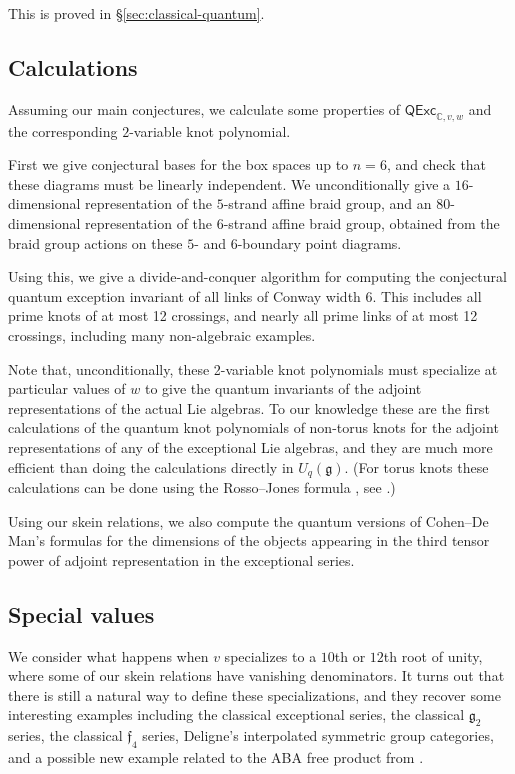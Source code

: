 \documentclass[12pt]{amsart}
\begin{document}
This is proved in \S \ref{sec:classical-quantum}.

\subsection{Calculations}
Assuming our main conjectures, we calculate some properties of
$\mathsf{QExc}_{\mathbb{C},v,w}$ and the corresponding $2$-variable knot
polynomial.

First we give conjectural bases for the box spaces up to $n=6$, and check that
these diagrams must be linearly independent.  We unconditionally give a
$16$-dimensional representation of the $5$-strand affine braid group, and an
$80$-dimensional representation of the $6$-strand affine braid group, obtained
from the braid group actions on these $5$- and $6$-boundary point diagrams.

Using this, we give a divide-and-conquer algorithm for computing the
conjectural quantum exception invariant of all links of Conway width 6.
This includes all prime knots of at most 12 crossings, and nearly all prime links of at most 12 crossings,
including many non-algebraic examples.

Note that, unconditionally, these 2-variable knot polynomials must specialize
at particular values of $w$ to give the quantum invariants of the adjoint
representations of the actual Lie algebras.  To our knowledge these are the
first calculations of the quantum knot polynomials of non-torus knots for the
adjoint representations of any of the exceptional Lie algebras, and they are
much more efficient than doing the calculations directly in $U_q(\mathfrak{g})$.
(For torus knots these calculations can be done using the Rosso--Jones formula
\cite{MR1209320}, see \cite{MR3491191}.)

Using our skein relations, we also compute the quantum versions of Cohen--De
Man's formulas for the dimensions of the objects appearing in the third tensor
power of adjoint representation in the exceptional series.

\subsection{Special values}


We consider what happens when $v$ specializes to a $10$th or $12$th root of
unity, where some of our skein relations have vanishing denominators. It turns
out that there is still a natural way to define these specializations, and
they recover some interesting examples including the classical exceptional
series, the classical $\mathfrak{g}_2$ series, the classical $\mathfrak{f}_4$
series, Deligne's interpolated symmetric group categories, and a possible new
example related to the ABA free product from \cite{MR3624901}.
\end{document}
